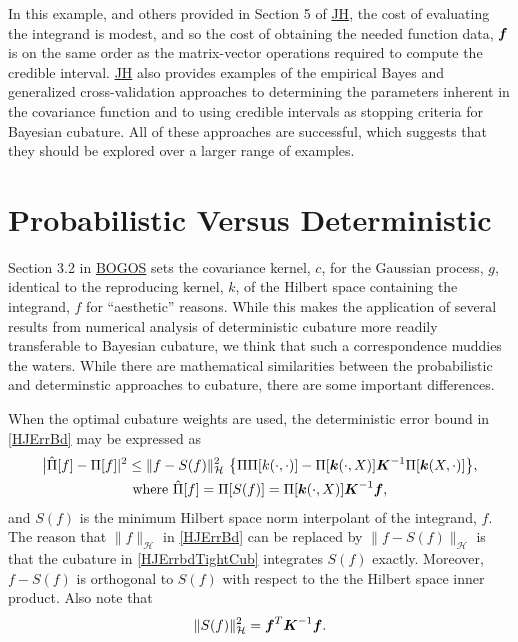 \documentclass[sts]{imsart}
\numberwithin{equation}{section}
\theoremstyle{plain}
\newcommand{\calH}{\mathcal{H}}
\newcommand{\BOGOS}{\hyperlink{BriEtal18a}{BOGOS}\xspace}
\newcommand{\JH}{\hyperlink{RatHic18a}{JH}\xspace}
\begin{document}
In this example, and others provided in Section 5 of \JH, the cost of evaluating the integrand is modest, and so the cost of obtaining the needed function data, $\boldsymbol{f}$ is on the same order as the matrix-vector operations required to compute the credible interval.  \JH also provides examples of the empirical Bayes and generalized cross-validation approaches to determining the parameters inherent in the covariance function and to using credible intervals as stopping criteria for Bayesian cubature.  All of these approaches are successful, which suggests that they should be explored over a larger range of examples.  

\section{Probabilistic Versus Deterministic} \label{sec:ProbDet}

Section 3.2 in \BOGOS sets the covariance kernel, $c$, for the Gaussian process, $g$, identical to the reproducing kernel, $k$, of the Hilbert space containing the integrand, $f$ for ``aesthetic'' reasons.  While this makes the application of several results from numerical analysis of deterministic cubature more readily transferable to Bayesian cubature, we think that such a correspondence muddies the waters.  While there are mathematical similarities between the probabilistic and determinstic approaches to cubature, there are some important differences.  

When the optimal cubature weights are used, the deterministic error bound in \eqref{HJErrBd} may be expressed as
\begin{subequations} \label{HJErrBdTight}
\begin{gather} 
    \label{HJErrBdBdTight}
    \bigl \lvert \hat{\Pi}[f] - \Pi[f] \rvert^2 \le \lVert f - S(f) \rVert_{\calH}^2 \ \bigl \{ \Pi\Pi[k(\cdot,\cdot)] - \Pi[\vk(\cdot, X)]\vK^{-1} \Pi[\vk(X,\cdot)]\bigr \} , \\
    \label{HJErrbdTightCub}
    \text{where } \hat{\Pi}[f] = \Pi[S(f)] = \Pi[\vk(\cdot, X)] \vK^{-1} \vf,
\end{gather}
\end{subequations}
and $S(f)$ is the minimum Hilbert space norm interpolant of the integrand, $f$.  The reason that $\lVert f \rVert_{\calH}$ in \eqref{HJErrBd} can be replaced by $\lVert f - S(f) \rVert_{\calH}$ is that the cubature in \eqref{HJErrbdTightCub} integrates $S(f)$ exactly. Moreover, $f - S(f)$ is orthogonal to $S(f)$ with respect to the the Hilbert space inner product.  Also note that
\begin{equation} \label{HJErrBdTight}
   \lVert S(f) \rVert^2_{\calH} = \vf^T \vK^{-1} \vf.
\end{equation}
\end{document}
